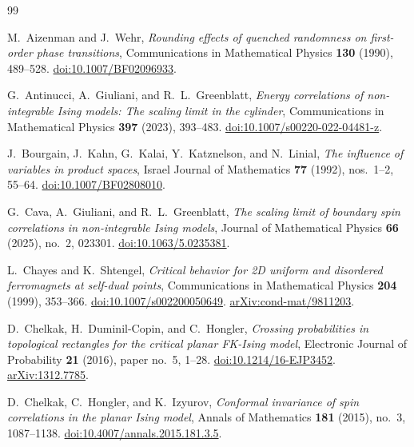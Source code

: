\begin{thebibliography}{99}

M.~Aizenman and J.~Wehr,
\emph{Rounding effects of quenched randomness on first-order phase transitions},
Communications in Mathematical Physics \textbf{130} (1990), 489--528.\newline
\href{https://doi.org/10.1007/BF02096933}{doi:10.1007/BF02096933}.

G.~Antinucci, A.~Giuliani, and R.~L.~Greenblatt,
\emph{Energy correlations of non-integrable Ising models: The scaling
limit in the cylinder},
Communications in Mathematical Physics \textbf{397} (2023), 393--483.
\href{https://doi.org/10.1007/s00220-022-04481-z}{doi:10.1007/s00220-022-04481-z}.

J.~Bourgain, J.~Kahn, G.~Kalai, Y.~Katznelson, and N.~Linial,
\emph{The influence of variables in product spaces},
Israel Journal of Mathematics \textbf{77} (1992), nos.~1--2, 55--64.
\href{https://doi.org/10.1007/BF02808010}{doi:10.1007/BF02808010}.

G.~Cava, A.~Giuliani, and R.~L.~Greenblatt,
\emph{The scaling limit of boundary spin correlations in non-integrable
Ising models},
Journal of Mathematical Physics \textbf{66} (2025), no.~2, 023301.
\href{https://doi.org/10.1063/5.0235381}{doi:10.1063/5.0235381}.

L.~Chayes and K.~Shtengel,
\emph{Critical behavior for 2D uniform and disordered ferromagnets
at self-dual points},
Communications in Mathematical Physics \textbf{204} (1999), 353--366.
\href{https://doi.org/10.1007/s002200050649}{doi:10.1007/s002200050649}.
\href{https://arxiv.org/abs/cond-mat/9811203}{arXiv:cond-mat/9811203}.

D.~Chelkak, H.~Duminil-Copin, and C.~Hongler,
\emph{Crossing probabilities in topological rectangles for the
critical planar FK-Ising model},
Electronic Journal of Probability \textbf{21} (2016), paper no.~5, 1--28.
\href{https://doi.org/10.1214/16-EJP3452}{doi:10.1214/16-EJP3452}.
\href{https://arxiv.org/abs/1312.7785}{arXiv:1312.7785}.

D.~Chelkak, C.~Hongler, and K.~Izyurov,
\emph{Conformal invariance of spin correlations in the planar Ising model},
Annals of Mathematics \textbf{181} (2015), no.~3, 1087--1138.\newline
\href{https://doi.org/10.4007/annals.2015.181.3.5}{doi:10.4007/annals.2015.181.3.5}.


\end{thebibliography}
